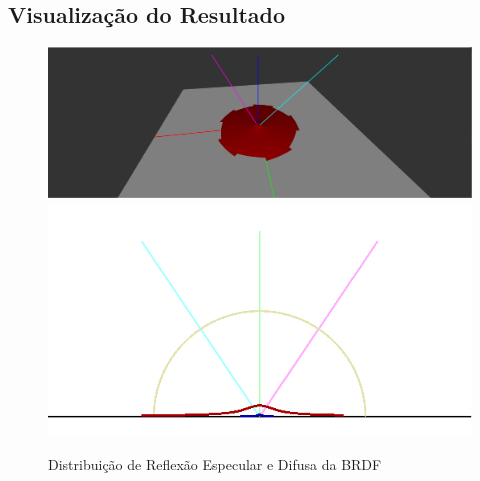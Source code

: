 \subsection{Visualização do Resultado}
\begin{figure}[H]
    \caption{\small{Distribuição de Reflexão Especular e Difusa da BRDF}}\label{fig-minnaert-plots}
    \vspace{42px}
  \includegraphics[width=\linewidth]{./Imagens/brdfs/minnaert-3D-plot}
\endminipage\hfill
{}
  \includegraphics[width=\linewidth]{./Imagens/brdfs/minnaert-polar-plot.png}
\endminipage\hfill
\end{figure}

